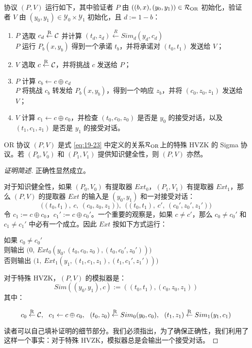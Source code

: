 协议 $(P,V)$ 运行如下，其中验证者 $P$ 由 $((b,x),(y_0,y_1))\in\mathcal{R}_{\rm OR}$ 初始化，验证者 $V$ 由 $(y_0,y_1)\in\mathcal{Y}_0\times\mathcal{Y}_1$ 初始化，且 $d:=1-b$：
\begin{enumerate}
	\item $P$ 选取 $c_d\overset{\rm R}\leftarrow\mathcal{C}$ 并计算 $(t_d,z_d)\overset{R}\leftarrow Sim_d(y_d,c_d)$\\$P$ 运行 $P_b(x,y_b)$ 得到一个承诺 $t_b$，并将承诺对 $(t_0,t_1)$ 发送给 $V$；
	\item $V$ 选取 $c\overset{\rm R}\leftarrow\mathcal{C}$，并将挑战 $c$ 发送给 $P$；
	\item $P$ 计算 $c_b\leftarrow c\oplus c_d$\\$P$ 将挑战 $c_b$ 转发给 $P_b(x,y_b)$，得到一个响应 $z_b$，并将 $(c_0,z_0,z_1)$ 发送给 $V$；
	\item $V$ 计算 $c_1\leftarrow c\oplus c_0$，并检查 $(t_0,c_0,z_0)$ 是否是 $y_0$ 的接受对话，以及 $(t_1,c_1,z_1)$ 是否是 $y_1$ 的接受对话。
\end{enumerate}

\begin{theorem}
OR 协议 $(P,V)$ 是式 \ref{eq:19-23} 中定义的关系$\mathcal{R}_{\rm OR}$上的特殊 HVZK 的 Sigma 协议。若 $(P_0,V_0)$ 和 $(P_1,V_1)$ 提供知识健全性，则 $(P, V)$ 亦然。
\end{theorem}

\begin{proof}[证明简述]
正确性显然成立。

对于知识健全性，如果 $(P_0,V_0)$ 有提取器 $Ext_0$，$(P_1,V_1)$ 有提取器 $Ext_1$，那么 $(P, V)$ 的提取器 $Ext$ 的输入是 $(y_0,y_1)$ 和一对接受对话：
$$
\big((t_0,t_1),~c,~(c_0,z_0,z_1)\big),~~
\big((t_0,t_1),~c',~(c_0',z_0',z_1')\big)
$$
令 $c_1:=c\oplus c_0$，$c_1':=c\oplus c_0'$。一个重要的观察是，如果 $c\neq c'$，那么 $c_0\neq c_0'$ 和 $c_1\neq c_1'$ 中必有一个成立。因此 $Ext$ 按如下方式运行：

\vspace{8pt}

\hspace*{30pt} 如果 $c_0\neq c_0'$\\
\hspace*{90pt} 则输出 $\Big(0,~Ext_0(y_0,(t_0,c_0,z_0),(t_0,c_0',z_0'))\Big)$\\
\hspace*{90pt} 否则输出 $\Big(1,~Ext_1(y_1,(t_1,c_1,z_1),(t_1,c_1',z_1'))\Big)$

\vspace{8pt}

对于特殊 HVZK，$(P, V)$ 的模拟器是：
$$
Sim((y_0,y_1),c):=((t_0,t_1),(c_0,z_0,z_1))
$$
其中：

$$
c_0\overset{\rm R}\leftarrow\mathcal{C},~~
c_1\leftarrow c\oplus c_0,~~
(t_0,z_0)\overset{\rm R}\leftarrow Sim_0(y_0,c_0),~~
(t_1,z_1)\overset{\rm R}\leftarrow Sim_1(y_1,c_1)
$$

读者可以自己填补证明的细节部分。我们必须指出，为了确保正确性，我们利用了这样一个事实：对于特殊 HVZK，模拟器总是会输出一个接受对话。
\end{proof}